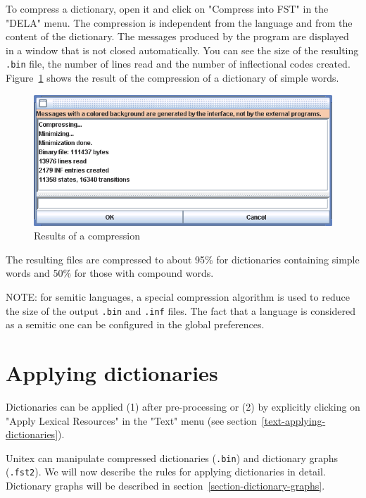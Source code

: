 \noindent To compress a dictionary, open it and click on "Compress into FST" in
the "DELA" menu. The compression is independent from the language and from the content of
the dictionary. The messages produced by the program are displayed in a window
that is not closed automatically. You can see the size of the resulting
\verb+.bin+ file, the number of lines read and the number of inflectional codes
created. Figure~\ref{fig-compression-result} shows the result of
the compression of a dictionary of simple words. \bigskip
\begin{figure}[!h]
\begin{center}
\includegraphics[width=14cm]{resources/img/fig3-11.png}
\caption{Results of a compression\label{fig-compression-result}}
\end{center}
\end{figure}

\bigskip
\noindent The resulting files are compressed to about 95\% for dictionaries containing
simple words and 50\% for those with compound words.

\bigskip
\noindent NOTE: for semitic languages, a special compression algorithm is used to reduce the size of
                the output \verb+.bin+ and \verb+.inf+ files. The fact that a language is considered as
                a semitic one can be configured in the global preferences.
\section{Applying dictionaries}
\label{section-applying-dictionaries}
Dictionaries can be applied (1) after pre-processing or (2) by explicitly 
clicking on "Apply Lexical Resources" in the  "Text" menu (see
section~\ref{text-applying-dictionaries}).

\bigskip
\noindent Unitex can manipulate compressed dictionaries (\verb+.bin+) and
dictionary graphs (\verb+.fst2+). We will now describe  the rules for applying dictionaries
in detail. Dictionary graphs will be described in
section~\ref{section-dictionary-graphs}.

